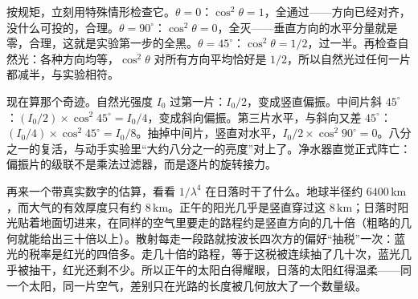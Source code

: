 \begin{center}
\end{center}

按规矩，立刻用特殊情形检查它。\(\theta=0\)：\(\cos^2\theta=1\)，全通过——方向已经对齐，没什么可投的，合理。\(\theta=90^\circ\)：\(\cos^2\theta=0\)，全灭——垂直方向的水平分量就是零，合理，这就是实验第一步的全黑。\(\theta=45^\circ\)：\(\cos^2\theta=1/2\)，过一半。再检查自然光：各种方向均等，\(\cos^2\theta\) 对所有方向平均恰好是 \(1/2\)，所以自然光过任何一片都减半，与实验相符。

现在算那个奇迹。自然光强度 \(I_0\) 过第一片：\(I_0/2\)，变成竖直偏振。中间片斜 \(45^\circ\)：\((I_0/2)\times\cos^2 45^\circ = I_0/4\)，变成斜向偏振。第三片水平，与斜向又差 \(45^\circ\)：\((I_0/4)\times\cos^2 45^\circ = I_0/8\)。抽掉中间片，竖直对水平，\(I_0/2\times\cos^2 90^\circ=0\)。八分之一的复活，与动手实验里“大约八分之一的亮度”对上了。净水器直觉正式阵亡：偏振片的级联不是乘法过滤器，而是逐片的旋转接力。

再来一个带真实数字的估算，看看 \(1/\lambda^4\) 在日落时干了什么。地球半径约 \(6400\,\mathrm{km}\)，而大气的有效厚度只有约 \(8\,\mathrm{km}\)。正午的阳光几乎是竖直穿过这 \(8\,\mathrm{km}\)；日落时阳光贴着地面切进来，在同样的空气里要走的路程约是竖直方向的几十倍（粗略的几何就能给出三十倍以上）。散射每走一段路就按波长四次方的偏好“抽税”一次：蓝光的税率是红光的四倍多。走几十倍的路程，等于这税被连续抽了几十次，蓝光几乎被抽干，红光还剩不少。所以正午的太阳白得耀眼，日落的太阳红得温柔——同一个太阳，同一片空气，差别只在光路的长度被几何放大了一个数量级。

